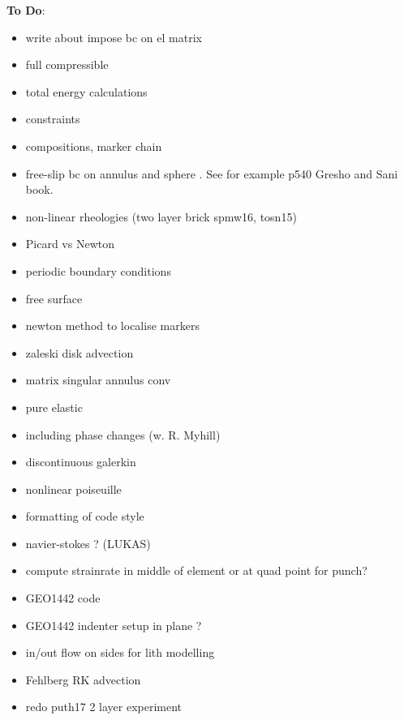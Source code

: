 \documentclass[a4paper]{article}
\begin{document}
\newpage
{\bf To Do}:

\begin{itemize}
\item
write about impose bc on el matrix

\item
full compressible 

\item
total energy calculations

\item
constraints

\item
compositions, marker chain

\item
free-slip bc on annulus and sphere . See for example p540 Gresho and Sani book.

\item
non-linear rheologies (two layer brick spmw16, tosn15) 

\item
Picard vs Newton

\item
periodic boundary conditions

\item
free surface 

\item 
newton method to localise markers

\item
zaleski disk advection

\item matrix singular annulus conv

\item
pure elastic 

\item
including phase changes (w. R. Myhill)

\item
discontinuous galerkin

\item
nonlinear poiseuille

\item
formatting of code style

\item
navier-stokes ? (LUKAS)

\item
compute strainrate in middle of element or at quad point for punch?

\item
GEO1442 code 

\item
GEO1442 indenter setup in plane ?

\item
in/out flow on sides for lith modelling

\item
Fehlberg RK advection

\item redo puth17 2 layer experiment

\end{itemize}
\end{document}
